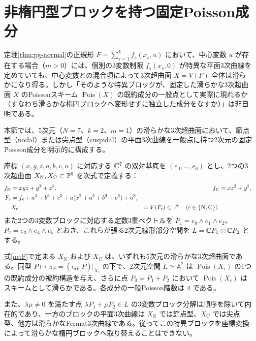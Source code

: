 \section{非楕円型ブロックを持つ固定Poisson成分}\label{ne:examples}

定理\ref{thm:pg-normal}の正規形 $F=\sum_{s=1}^k f_s(x_s,u)$ において、中心変数 $u$ が存在する場合（$m>0$）には、個別の3変数制限 $f_s(x_s,0)$ が特異な平面3次曲線を定めていても、中心変数との混合項によって3次超曲面 $X=V(F)$ 全体は滑らかになり得る。しかし「そのような特異ブロックが、固定した滑らかな3次超曲面 $X$ のPoissonスキーム $\operatorname{Pois}(X)$ の既約成分の一般点として実際に現れるか（すなわち滑らかな楕円ブロックへ変形せずに独立した成分をなすか）」は非自明である。

本節では、5次元（$N=7$、$k=2$、$m=1$）の滑らかな3次超曲面において、節点型（nodal）または尖点型（cuspidal）の平面3次曲線を一般点に持つ2次元の固定Poisson成分を明示的に構成する。

座標 $(x,y,z,a,b,c,u)$ に対応する $\mathbb C^7$ の双対基底を $(e_0,\ldots,e_6)$ とし、2つの3次超曲面 $X_{\mathrm N},X_{\mathrm C}\subset\mathbb P^6$ を次式で定義する：
\begin{equation}\label{ne:F}
\begin{aligned}
f_{\mathrm N}&=xyz+y^3+z^3,& f_{\mathrm C}&=xz^2+y^3,\\
F_\epsilon&=f_\epsilon+a^3+b^3+c^3+u(x^2+a^2+b^2+c^2)+u^3,\\
&X_\epsilon&=V(F_\epsilon)\subset\mathbb P^6
\quad(\epsilon\in\{\mathrm N,\mathrm C\}).
\end{aligned}
\end{equation}
また2つの3変数ブロックに対応する定数3重ベクトルを $P_1=e_0\wedge e_1\wedge e_2$、$P_2=e_3\wedge e_4\wedge e_5$ とおき、これらが張る2次元線形部分空間を $L=\mathbb C P_1\oplus\mathbb C P_2$ とする。

\begin{theorem}[非楕円型を一般点に持つ既約成分]\label{ne:main}
式\eqref{ne:F}で定まる $X_{\mathrm N}$ および $X_{\mathrm C}$ は、いずれも5次元の滑らかな3次超曲面である。同型 $P\mapsto\pi_P=(\iota_{dF_\epsilon}P)|_{X_\epsilon}$ の下で、2次元空間 $L\simeq\mathbb A^2$ は $\operatorname{Pois}(X_\epsilon)$ の1つの既約成分の被約構造を与え、さらに点 $P_0=P_1+P_2$ において $\operatorname{Pois}(X_\epsilon)$ はスキームとして滑らかである。各成分の一般Poisson階数は $4$ である。

また、$\lambda\mu\ne0$ を満たす点 $\lambda P_1+\mu P_2\in L$ の3変数ブロック分解は順序を除いて内在的であり、一方のブロックの平面3次曲線は $X_{\mathrm N}$ では節点型、$X_{\mathrm C}$ では尖点型、他方は滑らかなFermat3次曲線である。従ってこの特異ブロックを座標変換によって滑らかな楕円ブロックへ取り替えることはできない。
\end{theorem}

